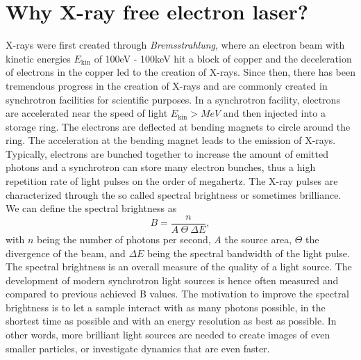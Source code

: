 \section{Why X-ray free electron laser?}\label{sec:xfel}
X-rays were first created through \textit{Bremsstrahlung}, where an electron beam with kinetic energies $E_{\text{kin}}$ of 100eV - 100keV hit a block of copper and the deceleration of electrons in the copper led to the creation of X-rays. Since then, there has been tremendous progress in the creation of X-rays and are commonly created in synchrotron facilities for scientific purposes. In a synchrotron facility, electrons are accelerated near the speed of light $E_{\text{kin}}>MeV$ and then injected into a storage ring. The electrons are deflected at bending magnets to circle around the ring. The acceleration at the bending magnet leads to the emission of X-rays. Typically, electrons are bunched together to increase the amount of emitted photons and a synchrotron can store many electron bunches, thus a high repetition rate of light pulses on the order of megahertz. The X-ray pulses are characterized through the so called spectral brightness \cite{Mills-2005-IUCR} or sometimes brilliance. We can define the spectral brightness as \cite{Als-Nielson-2011-JWS}
\begin{equation}
B = \frac{n}{A\ \Theta\ \Delta\! E},
\label{eq:spectral-brightness}
\end{equation}
with $n$ being the number of photons per second, $A$ the source area, $\Theta$ the divergence of the beam, and $\Delta\! E$ being the spectral bandwidth of the light pulse. The spectral brightness is an overall measure of the quality of a light source. The development of modern synchrotron light sources is hence often measured and compared to previous achieved B values. The motivation to improve the spectral brightness is to let a sample interact with as many photons possible, in the shortest time as possible and with an energy resolution as best as possible. In other words, more brilliant light sources are needed to create images of even smaller particles, or investigate dynamics that are even faster.
